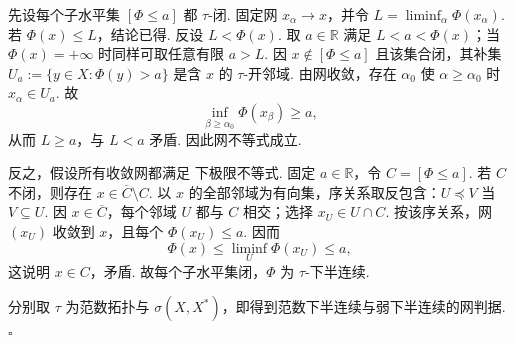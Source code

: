 \begin{FAProof}
先设每个子水平集 \(\displaystyle[\Phi\leqslant a]\) 都 \(\displaystyle\tau\)-闭. 固定网 \(\displaystyle x_\alpha\to x\)，并令 \(\displaystyle L=\liminf_\alpha\Phi(x_\alpha)\). 若 \(\displaystyle\Phi(x)\leqslant L\)，结论已得. 反设 \(\displaystyle L<\Phi(x)\). 取 \(\displaystyle a\in\mathbb R\) 满足 \(\displaystyle L<a<\Phi(x)\)；当 \(\displaystyle\Phi(x)=+\infty\) 时同样可取任意有限 \(\displaystyle a>L\). 因 \(\displaystyle x\notin[\Phi\leqslant a]\) 且该集合闭，其补集
\(\displaystyle U_a:=\{y\in X:\Phi(y)>a\}\)
是含 \(\displaystyle x\) 的 \(\displaystyle\tau\)-开邻域. 由网收敛，存在 \(\displaystyle\alpha_0\) 使 \(\displaystyle\alpha\geqslant\alpha_0\) 时 \(\displaystyle x_\alpha\in U_a\). 故
\[
\inf_{\beta\geqslant\alpha_0}\Phi(x_\beta)
\geqslant a,
\]
从而 \(\displaystyle L\geqslant a\)，与 \(\displaystyle L<a\) 矛盾. 因此网不等式成立.

反之，假设所有收敛网都满足 下极限不等式. 固定 \(\displaystyle a\in\mathbb R\)，令 \(\displaystyle C=[\Phi\leqslant a]\). 若 \(\displaystyle C\) 不闭，则存在 \(\displaystyle x\in\overline C\setminus C\). 以 \(\displaystyle x\) 的全部邻域为有向集，序关系取反包含：\(\displaystyle U\preceq V\) 当 \(\displaystyle V\subseteq U\). 因 \(\displaystyle x\in\overline C\)，每个邻域 \(\displaystyle U\) 都与 \(\displaystyle C\) 相交；选择 \(\displaystyle x_U\in U\cap C\). 按该序关系，网 \(\displaystyle(x_U)\) 收敛到 \(\displaystyle x\)，且每个 \(\displaystyle\Phi(x_U)\leqslant a\). 因而
\[
\Phi(x)
\leqslant
\liminf_U\Phi(x_U)
\leqslant a,
\]
这说明 \(\displaystyle x\in C\)，矛盾. 故每个子水平集闭，\(\displaystyle\Phi\) 为 \(\displaystyle\tau\)-下半连续.

分别取 \(\displaystyle\tau\) 为范数拓扑与 \(\displaystyle\sigma(X,X^*)\)，即得到范数下半连续与弱下半连续的网判据.
\hfill\(\square\)

\end{FAProof}

